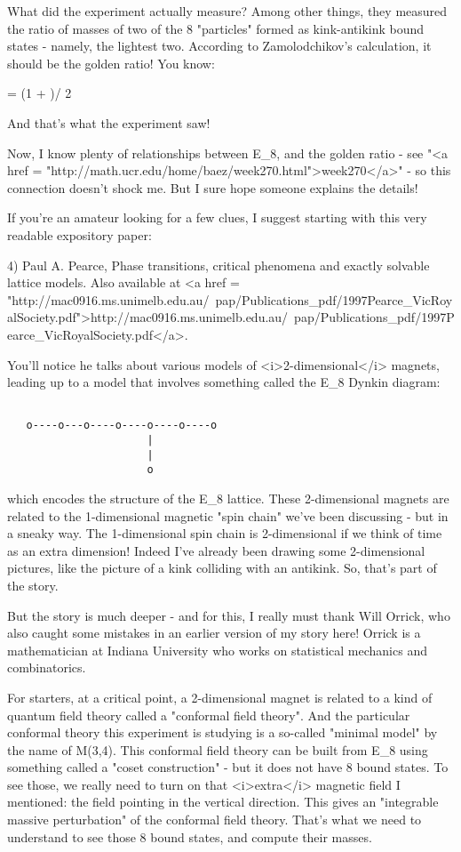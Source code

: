 What did the experiment actually measure?  Among other things,
they measured the ratio of masses of two of the 8 "particles"
formed as kink-antikink bound states - namely, the lightest two.
According to Zamolodchikov's calculation, it should be the golden
ratio!  You know:

\Phi  = (1 + )/ 2

And that's what the experiment saw!

Now, I know plenty of relationships between E_{8}, and the
golden ratio - see "<a href =
"http://math.ucr.edu/home/baez/week270.html">week270</a>" - so
this connection doesn't shock me.  But I sure hope someone explains
the details!

If you're an amateur looking for a few clues, I suggest starting with
this very readable expository paper:

4) Paul A. Pearce, Phase transitions, critical phenomena and exactly
solvable lattice models.  Also available at 
<a href = "http://mac0916.ms.unimelb.edu.au/~pap/Publications_pdf/1997Pearce_VicRoyalSociety.pdf">http://mac0916.ms.unimelb.edu.au/~pap/Publications_pdf/1997Pearce_VicRoyalSociety.pdf</a>.

You'll notice he talks about various models of <i>2-dimensional</i> magnets,
leading up to a model that involves something called the E_{8}
Dynkin diagram:


\begin{verbatim}

   o----o---o----o----o----o----o
                      |
                      |
                      o
\end{verbatim}
    
which encodes the structure of the E_{8} lattice.  
These 2-dimensional magnets are related to the 1-dimensional
magnetic "spin chain" we've been discussing - but in a sneaky
way.  The 1-dimensional spin chain is 2-dimensional if we think of time
as an extra dimension!  Indeed I've already been drawing some 
2-dimensional pictures, like the picture of a kink colliding with an
antikink.   So, that's part of the story.  

But the story is much deeper - and for this, I really must thank 
Will Orrick, who also caught some mistakes in an earlier version
of my story here!  Orrick is a mathematician at Indiana University
who works on statistical mechanics and combinatorics.

For starters, at a critical point, a 2-dimensional magnet is related
to a kind of quantum field theory called a "conformal field
theory".  And the particular conformal theory this experiment is
studying is a so-called "minimal model" by the name of
M(3,4).  This conformal field theory can be built from E_{8}
using something called a "coset construction" - but it does
not have 8 bound states.  To see those, we really need to turn on that
<i>extra</i> magnetic field I mentioned: the field pointing in the
vertical direction.  This gives an "integrable massive
perturbation" of the conformal field theory.  That's what we need
to understand to see those 8 bound states, and compute their masses.

